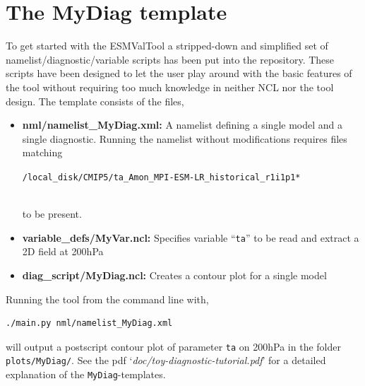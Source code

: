 \documentclass[12pt]{article}
\newcommand{\docref}[1]{`\emph{#1}'}
\begin{document}
\section{The MyDiag template}\label{section:MyDiag}
To get started with the ESMValTool a stripped-down and simplified set
of namelist/diagnostic/variable scripts has been put into the
repository. These scripts have been designed to let the user play
around with the basic features of the tool without requiring too much
knowledge in neither NCL nor the tool design. The template consists of
the files, 
\begin{itemize}
\item{\textbf{nml/namelist\_MyDiag.xml:}} A namelist defining a single
model and a single diagnostic. Running the namelist without
modifications requires files matching\vspace{5pt}\\
\small
\centerline{\texttt{/local\_disk/CMIP5/ta\_Amon\_MPI-ESM-LR\_historical\_r1i1p1*}}\vspace{5pt}\\
\normalsize
to be present. 
\item{\textbf{variable\_defs/MyVar.ncl:}} Specifies variable
``\texttt{ta}'' to be read and extract a 2D field at 200hPa
\item{\textbf{diag\_script/MyDiag.ncl:}} Creates a contour plot for a
single model
\end{itemize}
%
Running the tool from the command line with, 
\begin{Verbatim}
./main.py nml/namelist_MyDiag.xml
\end{Verbatim}
will output a postscript contour plot of parameter \texttt{ta} on
200hPa in the folder \texttt{plots/MyDiag/}. See the pdf
\docref{doc/toy-diagnostic-tutorial.pdf} for a detailed explanation of the
\texttt{MyDiag}-templates.

\end{document}
